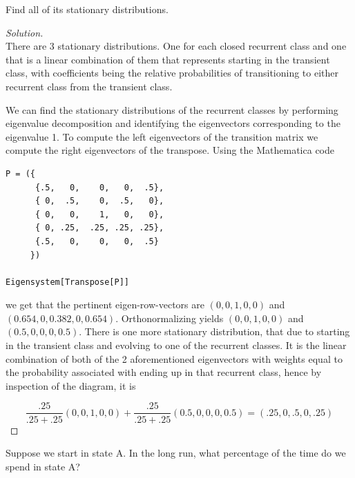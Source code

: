 \documentclass[12pt]{article}
\newenvironment{problem}[2][Problem]{\begin{trivlist}
\item[\hskip \labelsep {\bfseries #1}\hskip \labelsep {\bfseries #2.}]}{\end{trivlist}}
\newenvironment{solution}
  {\begin{proof}[Solution]\renewcommand{\qedsymbol}{}}
  {\end{proof}}
\begin{document}
\begin{problem}{3(b)} %
Find all of its stationary distributions.
\end{problem}
\begin{solution}\ \\

There are 3 stationary distributions. One for each closed recurrent class and one that is a linear combination of them that represents starting in the transient class, with coefficients being the relative probabilities of transitioning to either recurrent class from the transient class.

We can find the stationary distributions of the recurrent classes by performing eigenvalue decomposition and identifying the eigenvectors corresponding to the eigenvalue 1. To compute the left eigenvectors of the transition matrix we compute the right eigenvectors of the transpose. Using the Mathematica code \\
\lstset{language=Matlab}
\begin{lstlisting}[frame=single]  
P = ({
      {.5,   0,    0,   0,  .5},
      { 0,  .5,    0,  .5,   0},
   	  { 0,   0,    1,   0,   0},
      { 0, .25,  .25, .25, .25},
      {.5,   0,    0,   0,  .5}
     })

Eigensystem[Transpose[P]]
\end{lstlisting}

\noindent we get that the pertinent eigen-row-vectors are $(0,0,1,0,0)$ and $(0.654, 0, 0.382, 0, 0.654)$. Orthonormalizing yields $(0,0,1,0,0)$ and $(0.5, 0, 0, 0, 0.5)$. There is one more stationary distribution, that due to starting in the transient class and evolving to one of the recurrent classes. It is the linear combination of both of the 2 aforementioned eigenvectors with weights equal to the probability associated with ending up in that recurrent class, hence by inspection of the diagram, it is 

$$
\frac{.25}{.25+.25}(0,0,1,0,0) + \frac{.25}{.25+.25}(0.5, 0, 0, 0, 0.5) = (.25,0,.5,0,.25)
$$


\end{solution}

\begin{problem}{3(c)} %
Suppose we start in state A. In the long run, what percentage of the time do we spend
in state A?

\end{problem}
\end{document}

